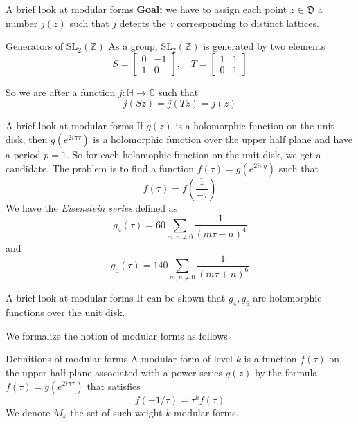 \documentclass[pdf]{beamer}
\begin{document}
\begin{frame}{A brief look at modular forms}
\textbf{Goal:} we have to assign each point $z \in \mathfrak{D}$ a number $j(z)$ such that $j$ detects the $z$ corresponding to distinct lattices. \pause
\begin{block}{Generators of $\text{SL}_2(\mathbb{Z})$}
As a group,  $\text{SL}_2(\mathbb{Z})$ is generated by two elements
\[S = \begin{bmatrix} 0 & -1 \\ 1 & 0 \end{bmatrix}, \quad T=\begin{bmatrix} 1 & 1 \\ 0 & 1 \end{bmatrix}\]
\end{block}\pause
So we are after a function $j \colon \mathbb{H} \to \mathbb{C}$ such that 
\[j(Sz)  = j(Tz) = j(z)\]
\end{frame}
\begin{frame}{A brief look at modular forms}
If $g(z)$ is a holomorphic function on the unit disk, then $g(e^{2i\pi\tau})$ is a holomorphic function over the upper half plane and have a period $p=1$. So for each holomophic function on the unit disk, we get a candidate. The problem is to find a function $f(\tau)= g(e^{2i\pi\eta})$ such that 
\[f(\tau) = f\left(\dfrac{1}{-\tau}\right)\]
We have the \textit{Eisenstein series} defined as 
\[g_4(\tau) = 60\sum_{m,n \ne 0} \dfrac{1}{(m\tau+n)^4}\]
and 
\[g_6(\tau) = 140\sum_{m,n \ne 0} \dfrac{1}{(m\tau+n)^6}\]
\end{frame}
\begin{frame}{A brief look at modular forms}
It can be shown that $g_4,g_6$ are holomorphic functions over the unit disk.

We formalize the notion of modular forms as follows 
\begin{block}{Definitions of modular forms}
A modular form of level $k$ is a function $f(\tau)$ on the upper half plane associated with a power series $g(z)$ by the formula $f(\tau) = g(e^{2i\pi\tau})$ that satisfies
\[f(-1/\tau)= \tau^k f\left(\tau\right)\]
We denote $M_k$ the set of such weight $k$ modular forms.
\end{block}
\end{frame}
\end{document}
